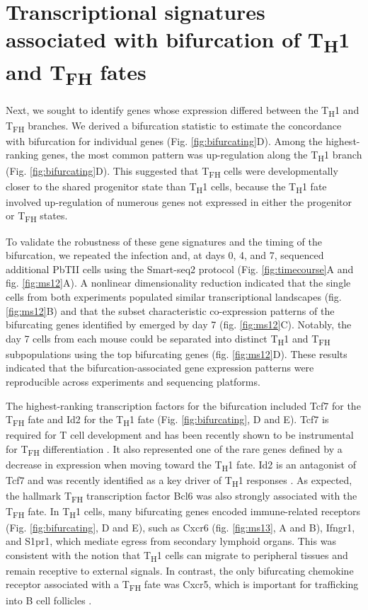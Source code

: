 \section{Transcriptional signatures associated with bifurcation of \texorpdfstring{T\textsubscript{H}1 and T\textsubscript{FH}}{TH1 and TFH} fates}

Next, we sought to identify genes whose expression differed between the T\textsubscript{H}1 and T\textsubscript{FH} branches. We derived a bifurcation statistic to estimate the concordance with bifurcation for individual genes (Fig. \ref{fig:bifurcating}D). Among the highest-ranking genes, the most common pattern was up-regulation along the T\textsubscript{H}1 branch (Fig. \ref{fig:bifurcating}D). This suggested that T\textsubscript{FH} cells were developmentally closer to the shared progenitor state than T\textsubscript{H}1 cells, because the T\textsubscript{H}1 fate involved up-regulation of numerous genes not expressed in either the progenitor or T\textsubscript{FH} states.

To validate the robustness of these gene signatures and the timing of the bifurcation, we repeated the infection and, at days 0, 4, and 7, sequenced additional PbTII cells using the Smart-seq2 protocol (Fig. \ref{fig:timecourse}A and fig. \ref{fig:ms12}A). A nonlinear dimensionality reduction indicated that the single cells from both experiments populated similar transcriptional landscapes (fig. \ref{fig:ms12}B) and that the subset characteristic co-expression patterns of the bifurcating genes identified by  emerged by day 7 (fig. \ref{fig:ms12}C). Notably, the day 7 cells from each mouse could be separated into distinct T\textsubscript{H}1 and T\textsubscript{FH} subpopulations using the top bifurcating genes (fig. \ref{fig:ms12}D). These results indicated that the bifurcation-associated gene expression patterns were reproducible across experiments and sequencing platforms.

The highest-ranking transcription factors for the bifurcation included Tcf7 for the T\textsubscript{FH} fate and Id2 for the T\textsubscript{H}1 fate (Fig.  \ref{fig:bifurcating}, D and E). Tcf7 is required for T cell development and has been recently shown to be instrumental for T\textsubscript{FH} differentiation \cite{Choi2015-wk, Xu2015-dc}. It also represented one of the rare genes defined by a decrease in expression when moving toward the T\textsubscript{H}1 fate. Id2 is an antagonist of Tcf7 and was recently identified as a key driver of T\textsubscript{H}1 responses \cite{Shaw2016-ya}. As expected, the hallmark T\textsubscript{FH} transcription factor Bcl6 was also strongly associated with the T\textsubscript{FH} fate. In T\textsubscript{H}1 cells, many bifurcating genes encoded immune-related receptors (Fig. \ref{fig:bifurcating}, D and E), such as Cxcr6 (fig.  \ref{fig:ms13}, A and B), Ifngr1, and S1pr1, which mediate egress from secondary lymphoid organs. This was consistent with the notion that T\textsubscript{H}1 cells can migrate to peripheral tissues and remain receptive to external signals. In contrast, the only bifurcating chemokine receptor associated with a T\textsubscript{FH} fate was Cxcr5, which is important for trafficking into B cell follicles \cite{Hardtke2005-mr}.


